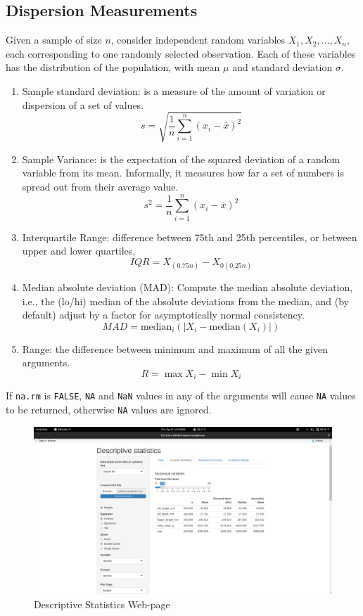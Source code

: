 \subsection{Dispersion Measurements}
Given a sample of size $n$, consider  independent random variables $X_1, X_2,\ldots, X_n$, each corresponding to one randomly selected observation. Each of these variables has the distribution of the population, with mean $\mu$ and standard deviation $\sigma$.
\begin{enumerate}
\item Sample standard deviation: is a measure of the amount of variation or dispersion of a set of values.
\[
s = \sqrt{\frac{1}{n}\sum^n_{i=1}(x_i-\bar{x})^2}
\]
\item Sample Variance: is the expectation of the squared deviation of a random variable from its mean. Informally, it measures how far a set of numbers is spread out from their average value. 
\[
s^2 = \frac{1}{n}\sum^n_{i=1}(x_i-\bar{x})^2
\]
\item Interquartile Range:  difference between 75th and 25th percentiles, or between upper and lower quartiles,
\[
IQR = X_{(0.75 n)}- X_{0(0.25 n)}
\]
\item Median absolute deviation (MAD): Compute the median absolute deviation, i.e., the (lo/hi) median of the absolute deviations from the median, and (by default) adjust by a factor for asymptotically normal consistency.
\[
MAD = \mbox{median}_i(|X_i-\mbox{median}(X_i)|)
\]
\item Range: the difference between minimum and maximum of all the given arguments.
\[
R = \max X_i - \min X_i
\]
\end{enumerate}
If {\tt na.rm} is {\tt FALSE}, {\tt NA} and {\tt NaN} values in any of the arguments will cause {\tt NA} values to be returned, otherwise {\tt NA} values are ignored.

\begin{figure}[h]
  \centering
  \includegraphics[width = \textwidth]{figures/Descriptive_2}
  \caption{Descriptive Statistics Web-page}\label{fig:DS2}
\end{figure}
